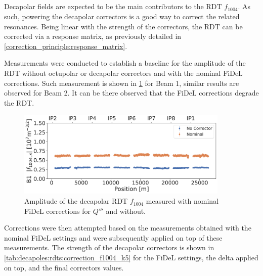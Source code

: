 \subsection{}
\label{section:decapoles:decapolar_contribution_correction}

Decapolar fields are expected to be the main contributors to the RDT $f_{1004}$. As such, powering
the decapolar correctors is a good way to correct the related resonances.
Being linear with the strength of the correctors, the RDT can be corrected via a response matrix,
as previously detailed in \cref{correction_principle:response_matrix}.

Measurements were conducted to establish a baseline for the amplitude of the RDT without octupolar
or decapolar correctors and with the nominal FiDeL corrections. Such measurement is shown in
\cref{fig:decapoles:rdt:b1_fidel_vs_bare} for Beam 1, similar results are observed for Beam 2. It
can be there observed that the FiDeL corrections degrade the RDT.

\begin{figure}[!htb]
    \centering
    \includegraphics[width=0.9\textwidth]{./images/f1004/f1004x_corrections_B1_fidel_vs_bare.pdf}
    \caption{Amplitude of the decapolar RDT $f_{1004}$ measured with nominal FiDeL corrections for 
    $Q'''$ and without.}
    \label{fig:decapoles:rdt:b1_fidel_vs_bare}
\end{figure}


Corrections were then attempted based on the measurements obtained with the nominal FiDeL settings
and were subsequently applied on top of these measurements.
The strength of the decapolar correctors is shown in \cref{tab:decapoles:rdts:correction_f1004_k5}
for the FiDeL settings, the delta applied on top, and the final correctors values.


